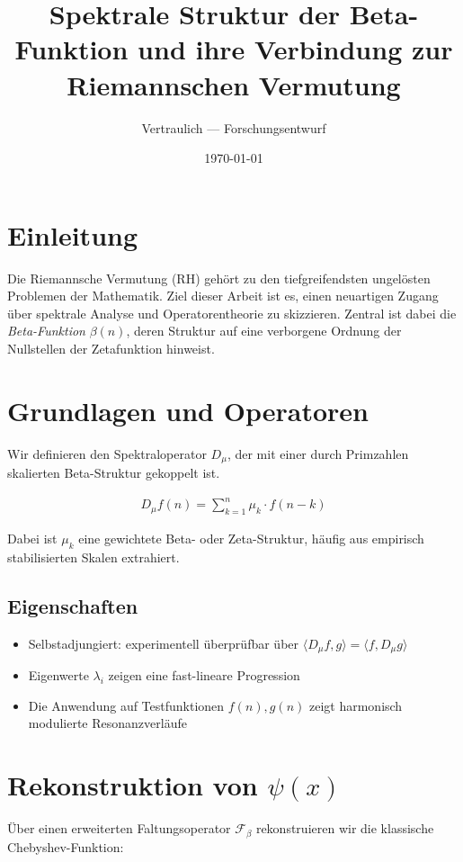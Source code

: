 \documentclass[a4paper,12pt]{article}
\title{\textbf{Spektrale Struktur der Beta-Funktion und ihre Verbindung zur Riemannschen Vermutung}}
\author{Vertraulich --- Forschungsentwurf}
\date{\today}
\begin{document}
\maketitle

\section*{Einleitung}
Die Riemannsche Vermutung (RH) gehört zu den tiefgreifendsten ungelösten Problemen der Mathematik. Ziel dieser Arbeit ist es, einen neuartigen Zugang über spektrale Analyse und Operatorentheorie zu skizzieren. Zentral ist dabei die \emph{Beta-Funktion} \( \beta(n) \), deren Struktur auf eine verborgene Ordnung der Nullstellen der Zetafunktion hinweist.

\section{Grundlagen und Operatoren}
Wir definieren den Spektraloperator \( D_\mu \), der mit einer durch Primzahlen skalierten Beta-Struktur gekoppelt ist.

\begin{align}
    D_\mu f(n) = \sum_{k=1}^{n} \mu_k \cdot f(n-k)
\end{align}

Dabei ist \( \mu_k \) eine gewichtete Beta- oder Zeta-Struktur, häufig aus empirisch stabilisierten Skalen extrahiert.

\subsection*{Eigenschaften}
\begin{itemize}
    \item Selbstadjungiert: experimentell überprüfbar über \( \langle D_\mu f, g \rangle = \langle f, D_\mu g \rangle \)
    \item Eigenwerte \( \lambda_i \) zeigen eine fast-lineare Progression
    \item Die Anwendung auf Testfunktionen \( f(n), g(n) \) zeigt harmonisch modulierte Resonanzverläufe
\end{itemize}

\section{Rekonstruktion von \( \psi(x) \)}
Über einen erweiterten Faltungsoperator \( \mathcal{F}_\beta \) rekonstruieren wir die klassische Chebyshev-Funktion:
\end{document}
